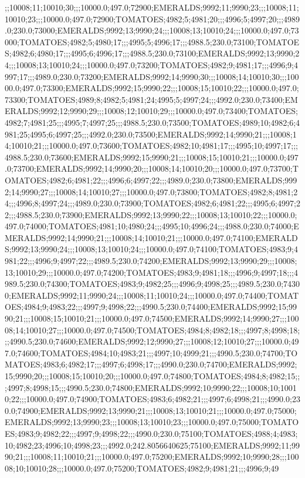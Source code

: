 ;;10008;11;10010;30;;;10000.0;497.0;72900;EMERALDS;9992;11;9990;23;;;10008;11;10010;23;;;10000.0;497.0;72900;TOMATOES;4982;5;4981;20;;;4996;5;4997;20;;;4989.0;230.0;73000;EMERALDS;9992;13;9990;24;;;10008;13;10010;24;;;10000.0;497.0;73000;TOMATOES;4982;5;4980;17;;;4995;5;4996;17;;;4988.5;230.0;73100;TOMATOES;4982;6;4980;17;;;4995;6;4996;17;;;4988.5;230.0;73100;EMERALDS;9992;13;9990;24;;;10008;13;10010;24;;;10000.0;497.0;73200;TOMATOES;4982;9;4981;17;;;4996;9;4997;17;;;4989.0;230.0;73200;EMERALDS;9992;14;9990;30;;;10008;14;10010;30;;;10000.0;497.0;73300;EMERALDS;9992;15;9990;22;;;10008;15;10010;22;;;10000.0;497.0;73300;TOMATOES;4989;8;4982;5;4981;24;4995;5;4997;24;;;4992.0;230.0;73400;EMERALDS;9992;12;9990;29;;;10008;12;10010;29;;;10000.0;497.0;73400;TOMATOES;4982;7;4981;25;;;4995;7;4997;25;;;4988.5;230.0;73500;TOMATOES;4989;10;4982;6;4981;25;4995;6;4997;25;;;4992.0;230.0;73500;EMERALDS;9992;14;9990;21;;;10008;14;10010;21;;;10000.0;497.0;73600;TOMATOES;4982;10;4981;17;;;4995;10;4997;17;;;4988.5;230.0;73600;EMERALDS;9992;15;9990;21;;;10008;15;10010;21;;;10000.0;497.0;73700;EMERALDS;9992;14;9990;20;;;10008;14;10010;20;;;10000.0;497.0;73700;TOMATOES;4982;6;4981;22;;;4996;6;4997;22;;;4989.0;230.0;73800;EMERALDS;9992;14;9990;27;;;10008;14;10010;27;;;10000.0;497.0;73800;TOMATOES;4982;8;4981;24;;;4996;8;4997;24;;;4989.0;230.0;73900;TOMATOES;4982;6;4981;22;;;4995;6;4997;22;;;4988.5;230.0;73900;EMERALDS;9992;13;9990;22;;;10008;13;10010;22;;;10000.0;497.0;74000;TOMATOES;4981;10;4980;24;;;4995;10;4996;24;;;4988.0;230.0;74000;EMERALDS;9992;14;9990;21;;;10008;14;10010;21;;;10000.0;497.0;74100;EMERALDS;9992;13;9990;24;;;10008;13;10010;24;;;10000.0;497.0;74100;TOMATOES;4983;9;4981;22;;;4996;9;4997;22;;;4989.5;230.0;74200;EMERALDS;9992;13;9990;29;;;10008;13;10010;29;;;10000.0;497.0;74200;TOMATOES;4983;9;4981;18;;;4996;9;4997;18;;;4989.5;230.0;74300;TOMATOES;4983;9;4982;25;;;4996;9;4998;25;;;4989.5;230.0;74300;EMERALDS;9992;11;9990;24;;;10008;11;10010;24;;;10000.0;497.0;74400;TOMATOES;4984;9;4983;22;;;4997;9;4998;22;;;4990.5;230.0;74400;EMERALDS;9992;15;9990;21;;;10008;15;10010;21;;;10000.0;497.0;74500;EMERALDS;9992;14;9990;27;;;10008;14;10010;27;;;10000.0;497.0;74500;TOMATOES;4984;8;4982;18;;;4997;8;4998;18;;;4990.5;230.0;74600;EMERALDS;9992;12;9990;27;;;10008;12;10010;27;;;10000.0;497.0;74600;TOMATOES;4984;10;4983;21;;;4997;10;4999;21;;;4990.5;230.0;74700;TOMATOES;4983;6;4982;17;;;4997;6;4998;17;;;4990.0;230.0;74700;EMERALDS;9992;15;9990;20;;;10008;15;10010;20;;;10000.0;497.0;74800;TOMATOES;4984;8;4982;15;;;4997;8;4998;15;;;4990.5;230.0;74800;EMERALDS;9992;10;9990;22;;;10008;10;10010;22;;;10000.0;497.0;74900;TOMATOES;4983;6;4982;21;;;4997;6;4998;21;;;4990.0;230.0;74900;EMERALDS;9992;13;9990;21;;;10008;13;10010;21;;;10000.0;497.0;75000;EMERALDS;9992;13;9990;23;;;10008;13;10010;23;;;10000.0;497.0;75000;TOMATOES;4983;9;4982;22;;;4997;9;4998;22;;;4990.0;230.0;75100;TOMATOES;4988;4;4983;10;4982;23;4996;10;4998;23;;;4992.0;242.8056640625;75100;EMERALDS;9992;11;9990;21;;;10008;11;10010;21;;;10000.0;497.0;75200;EMERALDS;9992;10;9990;28;;;10008;10;10010;28;;;10000.0;497.0;75200;TOMATOES;4982;9;4981;21;;;4996;9;49